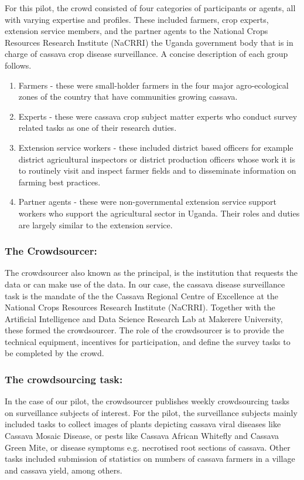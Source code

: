\documentclass[letterpaper]{article} %
\begin{document}
For this pilot, the crowd consisted of four categories of participants or agents, all with varying expertise and profiles. These included farmers, crop experts, extension service members, and the partner agents to the National Crops Resources Research Institute (NaCRRI) the Uganda government body that is in charge of cassava crop disease surveillance. A concise description of each group follows.
\begin{enumerate}
\item Farmers - these were small-holder farmers in the four major agro-ecological zones of the country that have communities growing cassava.
\item Experts - these were cassava crop subject matter experts who conduct survey related tasks as one of their research duties.
\item Extension service workers - these included district based officers for example district agricultural inspectors or district production officers whose work it is to routinely visit and inspect farmer fields and to disseminate information on farming best practices.
\item Partner agents - these were non-governmental extension service support workers who support the agricultural sector in Uganda. Their roles and duties are largely similar to the extension service.
\end{enumerate}

\subsubsection{The Crowdsourcer:}
The crowdsourcer also known as the principal, is the institution that requests the data or can make use of the data. In our case, the cassava disease surveillance task is the mandate of the the Cassava Regional Centre of Excellence at the National Crops Resources Research Institute (NaCRRI). Together with the Artificial Intelligence and Data Science Research Lab at Makerere University, these formed the crowdsourcer. The role of the crowdsourcer is to provide the technical equipment, incentives for participation, and define the survey tasks to be completed by the crowd.

\subsubsection{The crowdsourcing task:}
In the case of our pilot, the crowdsourcer publishes weekly crowdsourcing tasks on surveillance subjects of interest. For the pilot, the surveillance subjects mainly included tasks to collect images of plants depicting cassava viral diseases like Cassava Mosaic Disease, or pests like Cassava African Whitefly and Cassava Green Mite, or disease symptoms e.g. necrotised root sections of cassava. Other tasks included submission of statistics on numbers of cassava farmers in a village and cassava yield, among others.
\end{document}
